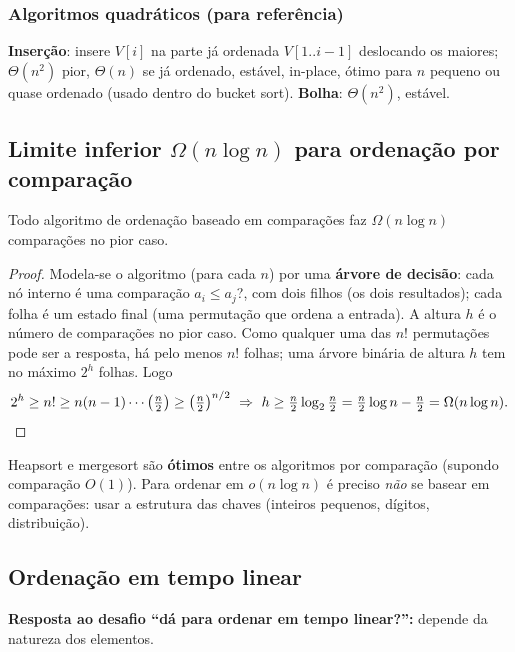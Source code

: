 \subsubsection*{Algoritmos quadráticos (para referência)}
\textbf{Inserção}: insere $V[i]$ na parte já ordenada $V[1..i-1]$ deslocando os maiores; $\Theta(n^2)$ pior, $\Theta(n)$ se já ordenado, estável, in-place, ótimo para $n$ pequeno ou quase ordenado (usado dentro do bucket sort). \textbf{Bolha}: $\Theta(n^2)$, estável.

\subsection{Limite inferior $\Omega(n\log n)$ para ordenação por comparação}
\begin{teo}
Todo algoritmo de ordenação baseado em comparações faz $\Omega(n\log n)$ comparações no pior caso.
\end{teo}
\begin{proof}
Modela-se o algoritmo (para cada $n$) por uma \textbf{árvore de decisão}: cada nó interno é uma comparação $a_i\le a_j$?, com dois filhos (os dois resultados); cada folha é um estado final (uma permutação que ordena a entrada). A altura $h$ é o número de comparações no pior caso. Como qualquer uma das $n!$ permutações pode ser a resposta, há pelo menos $n!$ folhas; uma árvore binária de altura $h$ tem no máximo $2^h$ folhas. Logo
\[
2^h\ge n!\ge n(n-1)\cdots\bigl(\tfrac n2\bigr)\ge\bigl(\tfrac n2\bigr)^{n/2}
\ \Rightarrow\ h\ge\tfrac n2\log_2\tfrac n2=\tfrac n2\log n-\tfrac n2=\Omega(n\log n).\qedhere
\]
\end{proof}
\begin{cor}
Heapsort e mergesort são \textbf{ótimos} entre os algoritmos por comparação (supondo comparação $O(1)$). Para ordenar em $o(n\log n)$ é preciso \emph{não} se basear em comparações: usar a estrutura das chaves (inteiros pequenos, dígitos, distribuição).
\end{cor}

\subsection{Ordenação em tempo linear}\label{sec:sortlin}
\textbf{Resposta ao desafio ``dá para ordenar em tempo linear?'':} depende da natureza dos elementos.

